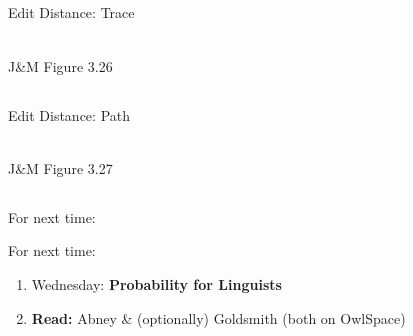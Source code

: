 \documentclass[9pt,xcolor=pdftex,dvipsnames,table]{beamer}
\begin{document}
\subsection{}
\begin{frame}{Edit Distance: Trace}
\begin{center}
	\\
	{\large J\&M Figure 3.26}\\
\end{center}
\end{frame}

\subsection{}
\begin{frame}{Edit Distance: Path}
\begin{center}
	\\
	{\large J\&M Figure 3.27}\\
\end{center}
\end{frame}


\subsection{}
\begin{frame}{For next time:}

     \begin{block}{For next time:}
          \begin{enumerate}
          \item Wednesday: \textbf{Probability for Linguists}
          \item \textbf{Read:} Abney \& (optionally) Goldsmith (both on OwlSpace)
          \end{enumerate}
     \end{block}
\end{frame}
\end{document}
